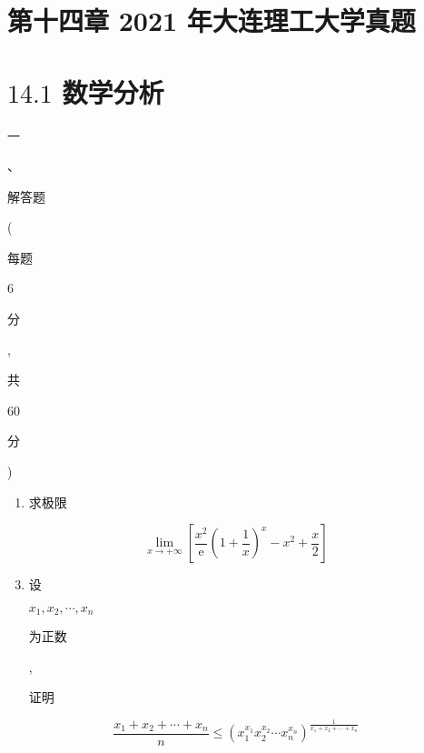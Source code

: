 \documentclass[10pt]{article}
\begin{document}
\section{第十四章 2021 年大连理工大学真题}
\section{$14.1$ 数学分析}
\begin{CJK}{UTF8}{mj}一\end{CJK}、\begin{CJK}{UTF8}{mj}解答题\end{CJK} (\begin{CJK}{UTF8}{mj}每题\end{CJK} 6 \begin{CJK}{UTF8}{mj}分\end{CJK}, \begin{CJK}{UTF8}{mj}共\end{CJK} 60 \begin{CJK}{UTF8}{mj}分\end{CJK})

\begin{enumerate}
  \item \begin{CJK}{UTF8}{mj}求极限\end{CJK}
\end{enumerate}
$$
\lim _{x \rightarrow+\infty}\left[\frac{x^{2}}{\mathrm{e}}\left(1+\frac{1}{x}\right)^{x}-x^{2}+\frac{x}{2}\right]
$$

\begin{enumerate}
  \setcounter{enumi}{2}
  \item \begin{CJK}{UTF8}{mj}设\end{CJK} $x_{1}, x_{2}, \cdots, x_{n}$ \begin{CJK}{UTF8}{mj}为正数\end{CJK}, \begin{CJK}{UTF8}{mj}证明\end{CJK}
\end{enumerate}
$$
\frac{x_{1}+x_{2}+\cdots+x_{n}}{n} \leq\left(x_{1}^{x_{1}} x_{2}^{x_{2}} \cdots x_{n}^{x_{n}}\right)^{\frac{1}{x_{1}+x_{2}+\cdots+x_{n}}}
$$
\end{document}
